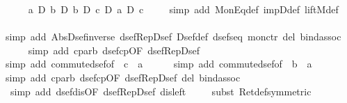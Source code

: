 \begin{isabellebody}
\ \ \isamarkupfalse%
\ {\isachardoublequote}{\isasymturnstile}\ {\isacharparenleft}a\ {\isacharequal}\isactrlsub D\ b{\isacharparenright}\ {\isasymlongrightarrow}\isactrlsub D\ {\isacharparenleft}b\ {\isacharequal}\isactrlsub D\ c{\isacharparenright}\ {\isasymlongrightarrow}\isactrlsub D\ {\isacharparenleft}a\ {\isacharequal}\isactrlsub D\ c{\isacharparenright}{\isachardoublequote}\isanewline
\ \ \ \ \isamarkupfalse%
simp\ add{\isacharcolon}\ MonEq{\isacharunderscore}def\ impD{\isacharunderscore}def\ liftM{}{\isacharunderscore}def{\isacharparenright}\isanewline
\ \ \ \ \isamarkupfalse%
simp\ add{\isacharcolon}\ Abs{\isacharunderscore}Dsef{\isacharunderscore}inverse\ dsef{\isacharunderscore}Rep{\isacharunderscore}Dsef\ Dsef{\isacharunderscore}def\ dsef{\isacharunderscore}seq\ mon{\isacharunderscore}ctr\ del{\isacharcolon}\ bind{\isacharunderscore}assoc{\isacharparenright}\isanewline
\ \ \ \ \isamarkupfalse%
simp\ add{\isacharcolon}\ cp{\isacharunderscore}arb\ dsef{\isacharunderscore}cp{\isacharbrackleft}OF\ dsef{\isacharunderscore}Rep{\isacharunderscore}Dsef{\isacharbrackright}{\isacharparenright}\ \isanewline
\ \ \ \ \isamarkupfalse%
simp\ add{\isacharcolon}\ commute{\isacharunderscore}dsef{\isacharbrackleft}of\ {\isachardoublequote}{\isasymDown}\ c{\isachardoublequote}\ {\isachardoublequote}{\isasymDown}\ a{\isachardoublequote}{\isacharbrackright}{\isacharparenright}\ \isanewline
\ \ \ \ \isamarkupfalse%
simp\ add{\isacharcolon}\ commute{\isacharunderscore}dsef{\isacharbrackleft}of\ {\isachardoublequote}{\isasymDown}\ b{\isachardoublequote}\ {\isachardoublequote}{\isasymDown}\ a{\isachardoublequote}{\isacharbrackright}{\isacharparenright}\ \isanewline
\ \ \ \ \isamarkupfalse%
simp\ add{\isacharcolon}\ cp{\isacharunderscore}arb\ dsef{\isacharunderscore}cp{\isacharbrackleft}OF\ dsef{\isacharunderscore}Rep{\isacharunderscore}Dsef{\isacharbrackright}\ del{\isacharcolon}\ bind{\isacharunderscore}assoc{\isacharparenright}\ \isanewline
\ \ \ \ \isamarkupfalse%
\ {\isacharparenleft}simp\ add{\isacharcolon}\ dsef{\isacharunderscore}dis{\isacharbrackleft}OF\ dsef{\isacharunderscore}Rep{\isacharunderscore}Dsef{\isacharbrackright}\ dis{\isacharunderscore}left{}{\isacharparenright}\isanewline
\ \ \ \ \isamarkupfalse%
subst\ Ret{\isacharunderscore}def{\isacharbrackleft}symmetric{\isacharbrackright}{\isacharparenright}\isanewline

\end{isabellebody}
